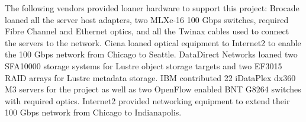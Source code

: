 \documentclass[]{sigplan-proc}
\begin{document}
The following vendors provided loaner hardware to support this project: Brocade loaned all the server host
adapters, two MLXe-16 100 Gbps switches, required Fibre Channel and Ethernet optics, and all the Twinax cables
used to connect the servers to the network. Ciena loaned optical equipment to Internet2 to enable the 100 Gbps
network from Chicago to Seattle. DataDirect Networks loaned two SFA10000 storage systems for Lustre object
storage targets and two EF3015 RAID arrays for Lustre metadata storage. IBM contributed 22 iDataPlex dx360 M3
servers for the project as well as two OpenFlow enabled BNT G8264 switches with required optics. Internet2
provided networking equipment to extend their 100 Gbps network from Chicago to Indianapolis.



\end{document}
